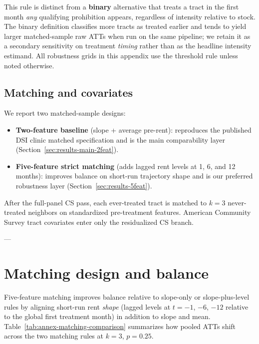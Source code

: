 This rule is distinct from a \textbf{binary} alternative that treats a tract in the first month \emph{any} qualifying prohibition appears, regardless of intensity relative to stock.
The binary definition classifies more tracts as treated earlier and tends to yield larger matched-sample raw ATTs when run on the same pipeline; we retain it as a secondary sensitivity on treatment \emph{timing} rather than as the headline intensity estimand.
All robustness grids in this appendix use the threshold rule unless noted otherwise.

\subsection{Matching and covariates}\label{app:matching-details}

We report two matched-sample designs:
\begin{itemize}
  \item \textbf{Two-feature baseline} (slope + average pre-rent): reproduces the published DSI clinic matched specification and is the main comparability layer (Section~\ref{sec:results-main-2feat}).
  \item \textbf{Five-feature strict matching} (adds lagged rent levels at 1, 6, and 12 months): improves balance on short-run trajectory shape and is our preferred robustness layer (Section~\ref{sec:results-5feat}).
\end{itemize}
After the full-panel CS pass, each ever-treated tract is matched to $k=3$ never-treated neighbors on standardized pre-treatment features.
American Community Survey tract covariates enter only the residualized CS branch.

---

\section{Matching design and balance}\label{app:matching}

Five-feature matching improves balance relative to slope-only or slope-plus-level rules by aligning short-run rent \emph{shape} (lagged levels at $t=-1$, $-6$, $-12$ relative to the global first treatment month) in addition to slope and mean.
Table~\ref{tab:annex-matching-comparison} summarizes how pooled ATTs shift across the two matching rules at $k=3$, $p=0.25$.

\begin{table}[htbp]
  \centering
  \caption{Two-feature vs.\ five-feature matching: pooled ATTs.}
  \label{tab:annex-matching-comparison}
  
\end{table}


